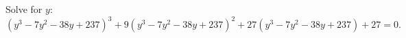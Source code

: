 Solve for $y$:
\[\left(y^3-7y^2-38y+237\right)^3+9\left(y^3-7y^2-38y+237\right)^2+27\left(y^3-7y^2-38y+237\right)+27=0.\]
